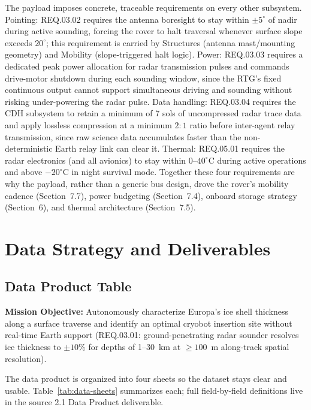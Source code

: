 \documentclass[11pt]{article}
\begin{document}
The payload imposes concrete, traceable requirements on every other subsystem. Pointing:
REQ.03.02 requires the antenna boresight to stay within $\pm 5^\circ$ of nadir during active
sounding, forcing the rover to halt traversal whenever surface slope exceeds $20^\circ$; this
requirement is carried by Structures (antenna mast/mounting geometry) and Mobility
(slope-triggered halt logic). Power: REQ.03.03 requires a dedicated peak power allocation for
radar transmission pulses and commands drive-motor shutdown during each sounding window, since
the RTG's fixed continuous output cannot support simultaneous driving and sounding without
risking under-powering the radar pulse. Data handling: REQ.03.04 requires the CDH subsystem to
retain a minimum of 7 sols of uncompressed radar trace data and apply lossless compression at a
minimum $2{:}1$ ratio before inter-agent relay transmission, since raw science data accumulates
faster than the non-deterministic Earth relay link can clear it. Thermal: REQ.05.01 requires the
radar electronics (and all avionics) to stay within $0$--$40^\circ$C during active operations and
above $-20^\circ$C in night survival mode. Together these four requirements are why the payload,
rather than a generic bus design, drove the rover's mobility cadence (Section~7.7), power
budgeting (Section~7.4), onboard storage strategy (Section~6), and thermal architecture
(Section~7.5).

\section{Data Strategy and Deliverables}

\subsection{Data Product Table}

\textbf{Mission Objective:} Autonomously characterize Europa's ice shell thickness
along a surface traverse and identify an optimal cryobot insertion site without real-time Earth
support (REQ.03.01: ground-penetrating radar sounder resolves ice thickness to $\pm 10\%$ for
depths of 1--30~km at $\geq 100$~m along-track spatial resolution).

The data product is organized into four sheets so the dataset stays clear and usable.
Table~\ref{tab:data-sheets} summarizes each; full field-by-field definitions live in the source
2.1 Data Product deliverable.
\end{document}
